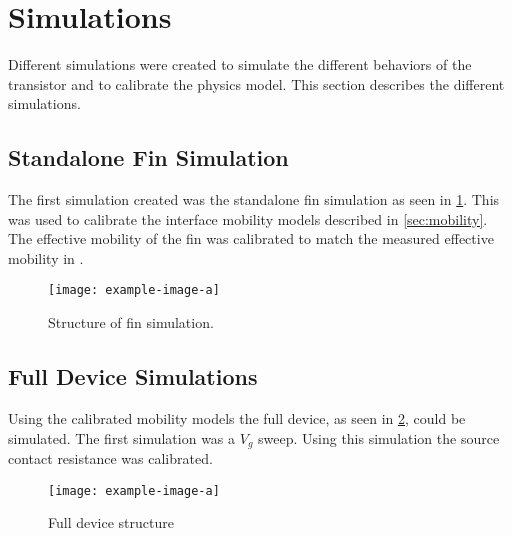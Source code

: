 \section{Simulations}
Different simulations were created to simulate the different behaviors of the transistor and to calibrate the physics model. This section describes the different simulations.

\subsection{Standalone Fin Simulation}
The first simulation created was the standalone fin simulation as seen in \cref{fig:fin}. This was used to calibrate the interface mobility models described in \cref{sec:mobility}. The effective mobility of the fin was calibrated to match the measured effective mobility in \cite{Gribisch2023}.

\begin{figure}[htb]
    \centering
    \texttt{[image: example-image-a]}
    \caption{Structure of fin simulation.}
    \label{fig:fin}
\end{figure}

\subsection{Full Device Simulations}
Using the calibrated mobility models the full device, as seen in \cref{fig:full_device}, could be simulated. The first simulation was a $V_g$ sweep. Using this simulation the source contact resistance was calibrated. 

\begin{figure}[htb]
    \centering
    \texttt{[image: example-image-a]}
    \caption{Full device structure}
    \label{fig:full_device}
\end{figure}